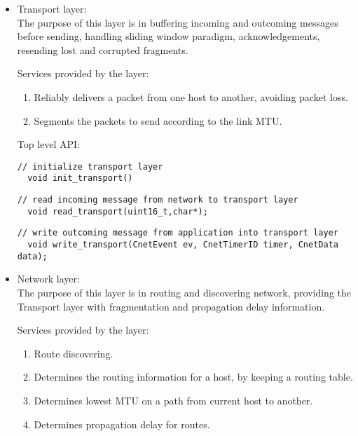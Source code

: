 \documentclass{book}
\begin{document}
\begin{itemize}		
\item	Transport layer: \\
		The purpose of this layer is in buffering incoming and outcoming
		 messages before sending, handling sliding window paradigm, 
		 acknowledgements, resending lost and corrupted fragments.
		
		Services provided by the layer:
    \begin{enumerate}
      \item Reliably delivers a packet from one host to another, avoiding
       packet loss.
      \item Segments the packets to send according to the link MTU.
    \end{enumerate}
		
		Top level API:
  
  \begin{lstlisting}
// initialize transport layer
  void init_transport()
\end{lstlisting}
    
		
		\begin{lstlisting}
// read incoming message from network to transport layer
  void read_transport(uint16_t,char*);
\end{lstlisting}
    
    
    \begin{lstlisting}
// write outcoming message from application into transport layer
  void write_transport(CnetEvent ev, CnetTimerID timer, CnetData data);
\end{lstlisting}
   
			
\item Network layer: \\
		The purpose of this layer is in routing and discovering network,
		 providing the Transport layer with fragmentation and propagation
		 delay information.
		
		Services provided by the layer:
    \begin{enumerate}
      \item Route discovering.
      \item Determines the routing information for a host, by keeping a routing
      table.
      \item Determines lowest MTU on a path from current host to another.
      \item Determines propagation delay for routes.
    \end{enumerate}
		

\end{itemize}
\end{document}

